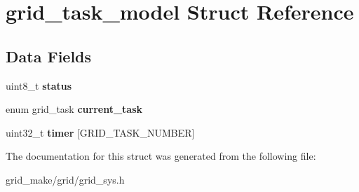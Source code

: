 \hypertarget{structgrid__task__model}{\section{grid\-\_\-task\-\_\-model Struct Reference}
\label{structgrid__task__model}
}
\subsection*{Data Fields}
\begin{DoxyCompactItemize}
\item 
\hypertarget{structgrid__task__model_ad85f586111663bf57a7930f710d80a02}{uint8\-\_\-t {\bfseries status}}\label{structgrid__task__model_ad85f586111663bf57a7930f710d80a02}

\item 
\hypertarget{structgrid__task__model_af1524eb66e4a50f4b6d868a3db3c1a63}{enum grid\-\_\-task {\bfseries current\-\_\-task}}\label{structgrid__task__model_af1524eb66e4a50f4b6d868a3db3c1a63}

\item 
\hypertarget{structgrid__task__model_ac784756c33a15ac16952604a9f9153e5}{uint32\-\_\-t {\bfseries timer} \mbox{[}G\-R\-I\-D\-\_\-\-T\-A\-S\-K\-\_\-\-N\-U\-M\-B\-E\-R\mbox{]}}\label{structgrid__task__model_ac784756c33a15ac16952604a9f9153e5}

\end{DoxyCompactItemize}


The documentation for this struct was generated from the following file\-:\begin{DoxyCompactItemize}
\item 
grid\-\_\-make/grid/grid\-\_\-sys.\-h\end{DoxyCompactItemize}
